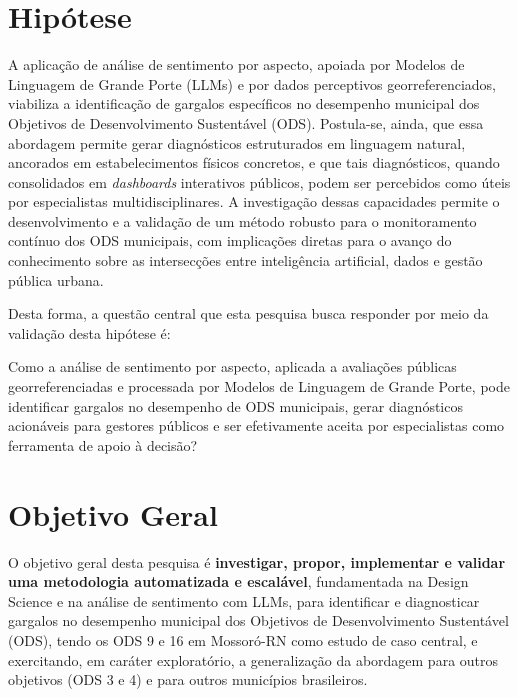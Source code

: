 \chapter{Hipótese}
\label{cap:hipotese}

A aplicação de análise de sentimento por aspecto, apoiada por Modelos de
Linguagem de Grande Porte (\gls{LLM}s) e por dados perceptivos
georreferenciados, viabiliza a identificação
de gargalos específicos no desempenho municipal dos Objetivos de
Desenvolvimento Sustentável (\gls{ODS}). Postula-se, ainda, que
essa abordagem permite gerar diagnósticos estruturados em linguagem
natural, ancorados em estabelecimentos físicos concretos, e que tais
diagnósticos, quando consolidados em \textit{dashboards} interativos
públicos, podem ser percebidos como úteis por especialistas
multidisciplinares. A investigação dessas capacidades permite o
desenvolvimento e a validação de um método robusto para o monitoramento
contínuo dos ODS municipais, com implicações diretas para o avanço do
conhecimento sobre as intersecções entre inteligência artificial, dados e gestão pública urbana.

Desta forma, a questão central que esta pesquisa busca responder por meio
da validação desta hipótese é:

\begin{citacao}
Como a análise de sentimento por aspecto, aplicada a avaliações públicas
georreferenciadas e processada por Modelos de Linguagem de Grande Porte,
pode identificar gargalos no desempenho de ODS municipais, gerar
diagnósticos acionáveis para gestores públicos e ser efetivamente aceita
por especialistas como ferramenta de apoio à decisão?
\end{citacao}

\chapter{Objetivo Geral}
\label{cap:objetivo-geral}

O objetivo geral desta pesquisa é \textbf{investigar, propor, implementar e
validar uma metodologia automatizada e escalável}, fundamentada na
Design Science e na análise de sentimento com \gls{LLM}s, para identificar e diagnosticar gargalos no desempenho municipal dos
Objetivos de Desenvolvimento Sustentável (\gls{ODS}), tendo os ODS 9 e 16
em Mossoró-RN como estudo de caso central, e exercitando, em
caráter exploratório, a generalização da abordagem para outros objetivos
(ODS 3 e 4) e para outros municípios brasileiros.

